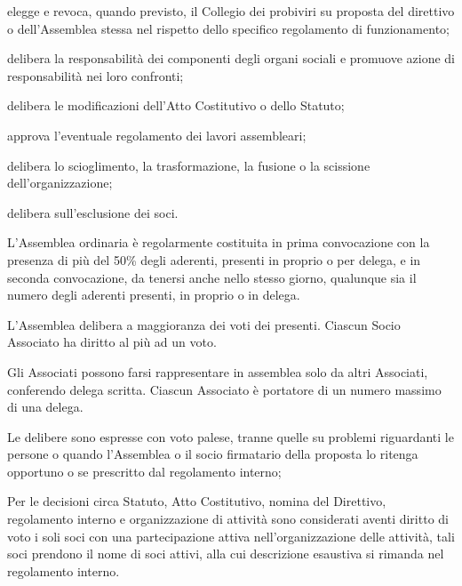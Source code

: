 \documentclass[legalpaper, 11pt]{exam}
\let\tempone\enumerate
\let\temptwo\endenumerate
\renewenvironment{enumerate}{\tempone\addtolength{\itemsep}{-0.45\baselineskip}}{\temptwo}
\begin{document}
\begin{enumerate}
\begin{enumerate}
		\item elegge e revoca, quando previsto, il Collegio dei probiviri su proposta del direttivo o dell’Assemblea stessa nel rispetto dello specifico regolamento di funzionamento;
		\item delibera la responsabilità dei componenti degli organi sociali e promuove azione di responsabilità nei loro confronti;
		\item delibera le modificazioni dell’Atto Costitutivo o dello Statuto;
		\item approva l’eventuale regolamento dei lavori assembleari;
		\item delibera lo scioglimento, la trasformazione, la fusione o la scissione dell’organizzazione;
		\item delibera sull’esclusione dei soci.
	\end{enumerate}
	\item L’Assemblea ordinaria è regolarmente costituita in prima convocazione con la presenza di più del 50\% degli aderenti, presenti in proprio o per delega, e in seconda convocazione, da tenersi anche nello stesso giorno, qualunque sia il numero degli aderenti presenti, in proprio o in delega.
	\item L’Assemblea delibera a maggioranza dei voti dei presenti. Ciascun Socio Associato ha diritto al più ad un voto.
	\item Gli Associati possono farsi rappresentare in assemblea solo da altri Associati, conferendo delega scritta. Ciascun Associato è portatore di un numero massimo di una delega.
	\item Le delibere sono espresse con voto palese, tranne quelle su problemi riguardanti le persone o quando l’Assemblea o il socio firmatario della proposta lo ritenga opportuno o se prescritto dal regolamento interno;
	\item Per le decisioni circa Statuto, Atto Costitutivo, nomina del Direttivo, regolamento interno e organizzazione di attività sono considerati aventi diritto di voto i soli soci con una partecipazione attiva nell’organizzazione delle attività, tali soci prendono il nome di soci attivi, alla cui descrizione esaustiva si rimanda nel regolamento interno.


\end{enumerate}
\end{document}
